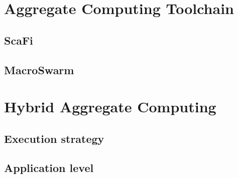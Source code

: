 \documentclass[presentation, 9pt]{beamer}\mode<presentation>{\usetheme{AMSBolognaFC}}
\begin{document}

\section{Aggregate Computing Toolchain}
\subsection{ScaFi}
\subsection{MacroSwarm}
\section{Hybrid Aggregate Computing}
\subsection{Execution strategy}
\subsection{Application level}
\end{document}
